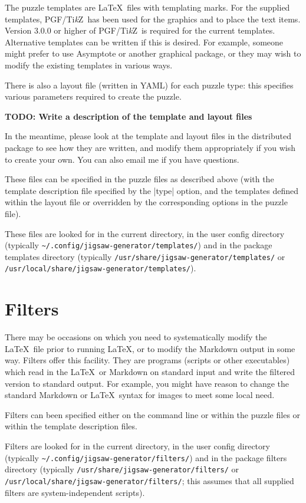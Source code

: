 \documentclass{article}
\def\YAML{{\small YAML}}
\def\PGF{{\small PGF}}
\def\TikZ{Ti\emph{k}Z}
\begin{document}
The puzzle templates are \LaTeX\ files with templating marks.  For the
supplied templates, \PGF/\TikZ\ has been used for the graphics and to
place the text items.  Version 3.0.0 or higher of \PGF/\TikZ\ is
required for the current templates.  Alternative templates can be
written if this is desired.  For example, someone might prefer to use
Asymptote or another graphical package, or they may wish to modify the
existing templates in various ways.

There is also a layout file (written in \YAML) for each puzzle type:
this specifies various parameters required to create the puzzle.

\textbf{TODO: Write a description of the template and layout files}

In the meantime, please look at the template and layout files in the
distributed package to see how they are written, and modify them
appropriately if you wish to create your own.  You can also email me
if you have questions.

These files can be specified in the puzzle files as described above
(with the template description file specified by the |type| option,
and the templates defined within the layout file or overridden by the
corresponding options in the puzzle file).

These files are looked for in the current directory, in the user config
directory (typically
\nolinkurl{~/.config/jigsaw-generator/templates/})
and in the package templates directory (typically
\nolinkurl{/usr/share/jigsaw-generator/templates/} or
\nolinkurl{/usr/local/share/jigsaw-generator/templates/}).

\section{Filters}
\label{sec:filters}

There may be occasions on which you need to systematically modify the
\LaTeX\ file prior to running \LaTeX, or to modify the Markdown output
in some way.  Filters offer this facility.  They are programs (scripts
or other executables) which read in the \LaTeX\ or Markdown on
standard input and write the filtered version to standard output.  For
example, you might have reason to change the standard Markdown or
\LaTeX\ syntax for images to meet some local need.

Filters can been specified either on the command line or within the
puzzle files or within the template description files.

Filters are looked for in the current directory, in the user config
directory (typically \nolinkurl{~/.config/jigsaw-generator/filters/})
and in the package filters directory (typically
\nolinkurl{/usr/share/jigsaw-generator/filters/} or
\nolinkurl{/usr/local/share/jigsaw-generator/filters/}; this assumes
that all supplied filters are system-independent scripts).
\end{document}
